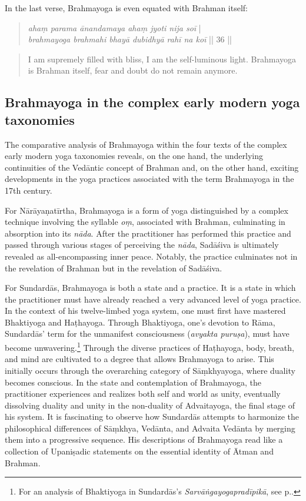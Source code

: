 In the last verse, Brahmayoga is even equated with Brahman itself:
\begin{quote}
\textit{ahaṃ parama ānandamaya ahaṃ jyoti nija soī} |\\
\textit{brahmayoga brahmahi bhayā dubidhyā rahī na koī} || 36 ||
\end{quote}
\begin{quote}
I am supremely filled with bliss, I am the self-luminous light. Brahmayoga is Brahman itself, fear and doubt do not remain anymore.
\end{quote}

\subsection{Brahmayoga in the complex early modern yoga taxonomies}

The comparative analysis of Brahmayoga within the four texts of the complex early modern yoga taxonomies reveals, on the one hand, the underlying continuities of the Vedāntic concept of Brahman and, on the other hand, exciting developments in the yoga practices associated with the term Brahmayoga in the 17th century.

For Nārāyaṇatīrtha, Brahmayoga is a form of yoga distinguished by a complex technique involving the syllable \textit{oṃ}, associated with Brahman, culminating in absorption into its \emph{nāda}. After the practitioner has performed this practice and passed through various stages of perceiving the \textit{nāda}, Sadāśiva is ultimately revealed as all-encompassing inner peace. Notably, the practice culminates not in the revelation of Brahman but in the revelation of Sadāśiva.

For Sundardās, Brahmayoga is both a state and a practice. It is a state in which the practitioner must have already reached a very advanced level of yoga practice. In the context of his twelve-limbed yoga system, one must first have mastered Bhaktiyoga and Haṭhayoga. Through Bhaktiyoga, one's devotion to Rāma, Sundardās' term for the unmanifest consciousness (\textit{avyakta puruṣa}), must have become unwavering.\footnote{For an analysis of Bhaktiyoga in Sundardās's \emph{Sarvāṅgayogapradīpikā}, see p.\pageref{sarvangabhakti}.} Through the diverse practices of Haṭhayoga, body, breath, and mind are cultivated to a degree that allows Brahmayoga to arise. This initially occurs through the overarching category of Sāṃkhyayoga, where duality becomes conscious. In the state and contemplation of Brahmayoga, the practitioner experiences and realizes both self and world as unity, eventually dissolving duality and unity in the non-duality of Advaitayoga, the final stage of his system. It is fascinating to observe how Sundardās attempts to harmonize the philosophical differences of Sāṃkhya, Vedānta, and Advaita Vedānta by merging them into a progressive sequence. His descriptions of Brahmayoga read like a collection of Upaniṣadic statements on the essential identity of Ātman and Brahman.

